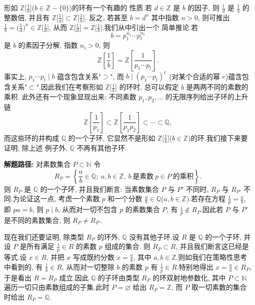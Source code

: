 形如 $\mathbb{Z}\bigl[ \frac{1}{b} \bigr]$($b \in \mathbb{Z} - \{ 0 \}$)的环有一个有趣的
性质.若 $d \in \mathbb{Z}$ 是 $b$ 的因子, 则 $\frac{1}{d}$ 是 $\frac{1}{b}$ 的整数倍,
并且有 $\mathbb{Z}\bigl[ \frac{1}{d} \bigr] \subset \mathbb{Z}\bigl[ \frac{1}{b} \bigr]$.
反之, 若甚至 $b = d^n$ 其中指数 $n > 0$, 则可推出 $\frac{1}{b} = \bigl(
\frac{1}{d} \bigr)^n \in \mathbb{Z}\bigl[ \frac{1}{d} \bigr]$, 从而
$\mathbb{Z}\bigl[ \frac{1}{d} \bigr] = \mathbb{Z}\bigl[ \frac{1}{b} \bigr]$.我们从中引出一个
简单推论.若
\[
b = p_1^{n_1} \cdots p_t^{n_t}
\]
是 $b$ 的素因子分解, 指数 $n_i > 0$, 则
\[
\mathbb{Z}\left[ \frac{1}{b} \right] = \mathbb{Z}\left[ \frac{1}{p_1 \cdots p_t} \right]\text{.}
\]
事实上, $p_1 \cdots p_t \mid b$ 蕴含包含关系"$\supset$", 而 $b \mid (p_1 \cdots p_t)^e$
(对某个合适的幂 $e$)蕴含包含关系"$\subset$".因此我们在考察形如
$\mathbb{Z}\bigl[ \frac{1}{b} \bigr]$ 的环时, 总可以假定 $b$ 是两两不同的素数的乘积.
此外还有一个现象显现出来: 不同素数 $p_1, p_2, \ldots$ 的无限序列给出子环的上升链
\[
\mathbb{Z}\left[ \frac{1}{p_1} \right] \subset \mathbb{Z}\left[ \frac{1}{p_1 p_2} \right] \subset \cdots \subset \mathbb{Q},
\]
而这些环的并构成 $\mathbb{Q}$ 的一个子环, 它显然不是形如
$\mathbb{Z}\bigl[ \frac{1}{b} \bigr]$($b \in \mathbb{Z}$)的环.我们接下来要证明, 除上述
例子外, $\mathbb{Q}$ 不再有其他子环.

\noindent\textbf{解题路径:} 对素数集合 $P \subset \mathbb{N}$ 令
\[
R_P = \left\{ \frac{a}{b} \in \mathbb{Q};\; a, b \in \mathbb{Z}, \ b\ \text{是素数}\ p \in P\ \text{的乘积} \right\}\text{.}
\]
则 $R_P$ 是 $\mathbb{Q}$ 的一个子环, 并且我们断言: 当素数集合 $P$ 与 $P'$ 不同时,
$R_P$ 与 $R_{P'}$ 不同.为论证这一点, 考虑一个素数 $p$ 和一个分数
$\frac{a}{b} \in \mathbb{Q}$($a, b \in \mathbb{Z}$).若存在方程 $\frac{1}{p} =
\frac{a}{b}$, 即 $pa = b$, 则 $p \mid b$, 从而对一切不包含 $p$ 的素数集合 $P$, 有
$\frac{1}{p} \notin R_P$.因此若 $P$ 与 $P'$ 是不同的素数集合, 则 $R_P \neq R_{P'}$.

现在我们还要证明, 除类型 $R_P$ 的环外, $\mathbb{Q}$ 没有其他子环.设 $R$ 是
$\mathbb{Q}$ 的一个子环, 并设 $P$ 是所有满足 $\frac{1}{p} \in R$ 的素数 $p$ 组成的集合.
则 $R_P \subset R$, 并且我们断言这已经是等式.设 $x \in R$, 并把 $x$ 写成既约分数
$x = \frac{a}{b}$, 其中 $a, b \in \mathbb{Z}$.则如我们在策略性思考中看到的, 有
$\frac{1}{b} \in R$, 从而对一切整除 $b$ 的素数 $p$ 有 $\frac{1}{p} \in R$.特别地得出
$x = \frac{a}{b} \in R_P$, 于是看出 $R = R_P$ 成立.因此 $\mathbb{Q}$ 的子环由类型
$R_P$ 的环双射地参数化, 其中 $P \subset \mathbb{N}$ 遍历一切只由素数组成的子集.此时
$P = \varnothing$ 给出 $R_P = \mathbb{Z}$, 而 $P$ 取一切素数的集合时给出
$R_P = \mathbb{Q}$.

